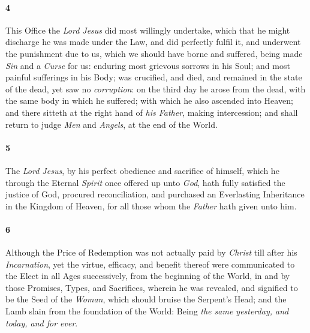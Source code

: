 \documentclass[
    paper=letterpaper,
    11pt,
    twoside,
    DIV=calc,
    openany
]{scrbook}
\newcommand{\ERRATA}[1]{}
\newcommand{\oldgrammar}[2]{#2}
\begin{document}
\paragraph{4} %
This Office the \textit{Lord Jesus} did most \R{}willingly undertake, which that he might discharge he was made under the Law, \R{}and did perfectly fulfil it, and underwent the \R{}punishment due to us, which we should have \oldgrammar{born}{borne} and suffered, being made \R{}\textit{Sin} and a \textit{Curse} for us: enduring most grievous sorrows \R{}in his Soul; and most painful sufferings in his Body; was crucified, and died, and remained in the state of the dead, yet saw no \R{}\textit{corruption}: on the \R{}third day he arose from the dead, with the same \R{}body in which he suffered; with which he also \R{}ascended into Heaven; and there sitteth at the right hand of \textit{his Father}, \R{}making intercession; and shall \R{}return to judge \textit{Men} and \textit{Angels}, at the end of the World.

\footnotebegin
\ERRATA{
1688, 1719:  Hebrews 10:5-11
lbcw, Reni:  Hebrews 10:5-10
}
\footnoteend

\paragraph{5} %
The \textit{Lord Jesus}, by his perfect obedience and sacrifice of himself, which he through the Eternal \textit{Spirit} once offered up unto \textit{God}, \R{}hath fully satisfied the justice of God, procured reconciliation, and purchased an Everlasting Inheritance in the Kingdom of Heaven, \R{}for all those whom the \textit{Father} hath given unto him.

\footnotebegin
{}
\footnoteend

\paragraph{6} %
Although the Price of Redemption was not actually paid by \textit{Christ} till after his \textit{Incarnation}, \Rs{}yet the virtue, efficacy, and benefit thereof were communicated to the Elect in all Ages successively, from the beginning of the World, in and by those Promises, Types, and Sacrifices, wherein he was revealed, and signified to be the Seed of the \textit{Woman}, which should bruise the Serpent’s Head; \R{}and the Lamb slain from the foundation of the World: \R{}Being \textit{the same yesterday, and \oldgrammar{to day}{today}, and for ever}.
\end{document}
